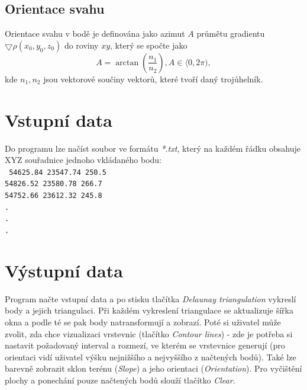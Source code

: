 \documentclass{article}
\begin{document}
\subsection{Orientace svahu}
\indent Orientace svahu v bodě je definována jako azimut $A$ průmětu gradientu $\bigtriangledown\rho(x_0,y_0,z_0)$ do roviny $xy$, který se spočte jako
$$A = \arctan(\frac{n_1}{n_2}), A\in\langle0,2\pi),$$
kde $n_1, n_2$ jsou vektorové součiny vektorů, které tvoří daný trojůhelník.

\section{Vstupní data}
\indent Do programu lze načíst soubor ve formátu \textit{*.txt}, který na každém řádku obsahuje XYZ souřadnice jednoho vkládaného bodu: \\
\texttt{
54625.84 23547.74 250.5 \\
54826.52 23580.78 266.7 \\
54752.66 23612.32 245.8 \\
.\\
.\\
.}
\section{Výstupní data}
\indent Program načte vstupní data a po stisku tlačítka \textit{Delaunay triangulation} vykreslí body a jejich triangulaci. Při každém vykreslení triangulace se aktualizuje šířka okna a podle té se pak body natransformují a zobrazí.
\indent Poté si uživatel může zvolit, zda chce vizualizaci vrstevnic (tlačítko \textit{Contour lines}) - zde je potřeba si nastavit požadovaný interval a rozmezí, ve kterém se vrstevnice generují (pro orientaci vidí uživatel výšku nejnižšího a nejvyššího z načtených bodů). Také lze barevně zobrazit sklon terénu (\textit{Slope}) a  jeho orientaci (\textit{Orientation}). Pro vyčištění plochy a ponechání pouze načtených bodů slouží tlačítko \textit{Clear}. \\
\end{document}
